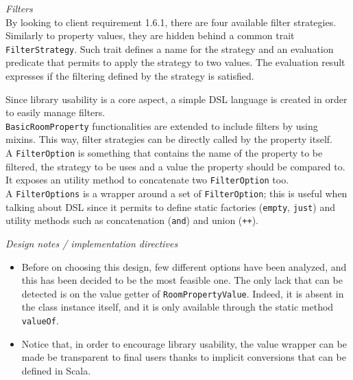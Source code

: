 \bigskip
\textit{Filters}
\\
By looking to client requirement 1.6.1, there are four available filter strategies. Similarly to property values, they are hidden behind a common trait \texttt{FilterStrategy}. Such trait defines a name for the strategy and an evaluation predicate that permits to apply the strategy to two values. The evaluation result expresses if the filtering defined by the strategy is satisfied.

\bigskip
Since library usability is a core aspect, a simple DSL language is created in order to easily manage filters.
\\
\texttt{BasicRoomProperty} functionalities are extended to include filters by using mixins. This way, filter strategies can be directly called by the property itself.
\\
A \texttt{FilterOption} is something that contains the name of the property to be filtered, the strategy to be uses and a value the property should be compared to. It exposes an utility method to concatenate two \texttt{FilterOption} too.
\\
A \texttt{FilterOptions} is a wrapper around a set of \texttt{FilterOption}; this is useful when talking about DSL since it permits to define static factories (\texttt{empty}, \texttt{just}) and utility methods such as concatenation (\texttt{and}) and union (\texttt{++}).

\bigskip
\textit{Design notes / implementation directives}
\\
\begin{itemize}
\item Before on choosing this design, few different options have been analyzed, and this has been decided to be the most feasible one. The only lack that can be detected is on the value getter of \texttt{RoomPropertyValue}. Indeed, it is absent in the class instance itself, and it is only available through the static method \texttt{valueOf}.
\item Notice that, in order to encourage library usability, the value wrapper can be made be transparent to final users thanks to implicit conversions that can be defined in Scala.
\end{itemize}

